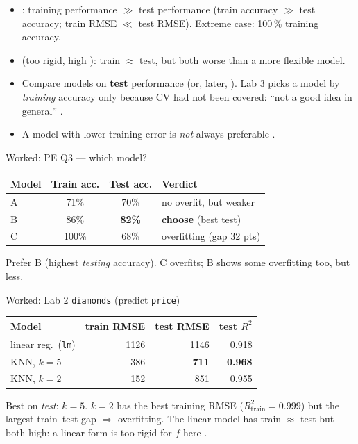\begin{trap}
\begin{itemize}
\item {}: training performance $\gg$ test performance (train accuracy $\gg$ test accuracy;
  train RMSE $\ll$ test RMSE). Extreme case: 100\,\% training accuracy.
\item {} (too rigid, high ): train $\approx$ test, but both worse than a more flexible model.
\item Compare models on \textbf{test} performance (or, later, ). Lab 3 picks a model by
  \emph{training} accuracy only because CV had not been covered: ``not a good idea in general'' .
\item A model with lower training error is \emph{not} always preferable .
\end{itemize}
\end{trap}

\begin{qbox}{Worked: PE Q3 --- which model?}
\begin{tabular}{@{}lccl@{}}
\toprule
Model & Train acc. & Test acc. & Verdict\\
\midrule
A & 71\% & 70\% & no overfit, but weaker\\
B & 86\% & \textbf{82\%} & \textbf{choose} (best test)\\
C & 100\% & 68\% & overfitting (gap 32 pts)\\
\bottomrule
\end{tabular}
\sol Prefer B (highest \emph{testing} accuracy). C overfits; B shows some overfitting too, but less. 
\end{qbox}

\begin{qbox}{Worked: Lab 2 \texttt{diamonds} (predict \texttt{price})}
%
\begin{tabular}{@{}lrrr@{}}
\toprule
Model & train RMSE & test RMSE & test $R^2$\\
\midrule
linear reg.\ (\texttt{lm}) & 1126 & 1146 & 0.918\\
KNN, $k=5$ & 386 & \textbf{711} & \textbf{0.968}\\
KNN, $k=2$ & 152 & 851 & 0.955\\
\bottomrule
\end{tabular}
\par Best on \emph{test}:  $k=5$. $k=2$ has the best training RMSE ($R^2_{\text{train}}=0.999$) but the largest
train--test gap $\Rightarrow$ overfitting. The linear model has train $\approx$ test but both high: a linear form is
too rigid for $f$ here .
\end{qbox}

